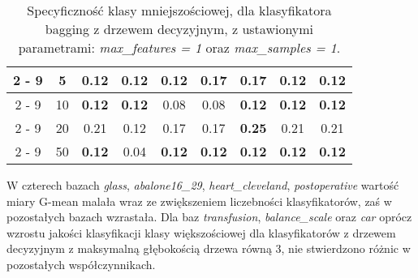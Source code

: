 \begin{table}[H]
\begin{center}
{\begin{tabular}{c|c|ccccccc}
				\cline{2%
					-%
					9}%
				&5&0.12&0.12&0.12&\textbf{0.17}&\textbf{0.17}&0.12&0.12\\%
				\cline{2%
					-%
					9}%
				&10&\textbf{0.12}&\textbf{0.12}&0.08&0.08&\textbf{0.12}&\textbf{0.12}&\textbf{0.12}\\%
				\cline{2%
					-%
					9}%
				&20&0.21&0.12&0.17&0.17&\textbf{0.25}&0.21&0.21\\%
				\cline{2%
					-%
					9}%
				&50&\textbf{0.12}&0.04&\textbf{0.12}&\textbf{0.12}&\textbf{0.12}&\textbf{0.12}&\textbf{0.12}\\%
				\hline%
			\end{tabular}}
			\caption{Specyficzność klasy mniejszościowej, dla klasyfikatora bagging z drzewem decyzyjnym, z ustawionymi parametrami: \textit{max\_features = 1} oraz \textit{max\_samples = 1}.}
			\label{baggingdrzewospec}
		\end{center}
	\end{table}
W czterech bazach \textit{glass}, \textit{abalone16\_29}, \textit{heart\_cleveland}, \textit{postoperative} wartość miary G-mean malała wraz ze zwiększeniem liczebności klasyfikatorów, zaś w pozostałych bazach wzrastała. Dla baz \textit{transfusion}, \textit{balance\_scale} oraz \textit{car} oprócz wzrostu jakości klasyfikacji klasy większościowej dla klasyfikatorów z drzewem decyzyjnym z maksymalną głębokością drzewa równą 3, nie stwierdzono różnic w pozostałych współczynnikach. 

